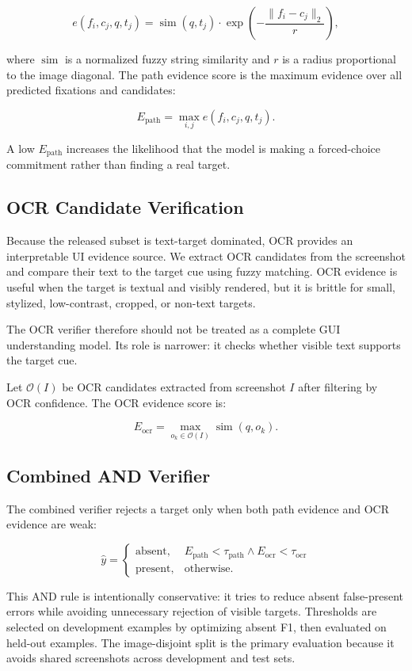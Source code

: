 \[
  e(f_i, c_j, q, t_j) =
  \operatorname{sim}(q,t_j) \cdot \exp\left(-\frac{\|f_i-c_j\|_2}{r}\right),
\]

where $\operatorname{sim}$ is a normalized fuzzy string similarity and $r$ is a radius proportional to the image diagonal. The path evidence score is the maximum evidence over all predicted fixations and candidates:

\[
  E_{\mathrm{path}} = \max_{i,j} e(f_i,c_j,q,t_j).
\]

A low $E_{\mathrm{path}}$ increases the likelihood that the model is making a forced-choice commitment rather than finding a real target.

\subsection{OCR Candidate Verification}

Because the released subset is text-target dominated, OCR provides an interpretable UI evidence source. We extract OCR candidates from the screenshot and compare their text to the target cue using fuzzy matching. OCR evidence is useful when the target is textual and visibly rendered, but it is brittle for small, stylized, low-contrast, cropped, or non-text targets.

The OCR verifier therefore should not be treated as a complete GUI understanding model. Its role is narrower: it checks whether visible text supports the target cue.

Let $\mathcal{O}(I)$ be OCR candidates extracted from screenshot $I$ after filtering by OCR confidence. The OCR evidence score is:

\[
  E_{\mathrm{ocr}} = \max_{o_k \in \mathcal{O}(I)} \operatorname{sim}(q,o_k).
\]

\subsection{Combined AND Verifier}

The combined verifier rejects a target only when both path evidence and OCR evidence are weak:

\[
  \hat{y} =
  \begin{cases}
  \mathrm{absent}, & E_{\mathrm{path}} < \tau_{\mathrm{path}} \land E_{\mathrm{ocr}} < \tau_{\mathrm{ocr}}\\
  \mathrm{present}, & \mathrm{otherwise.}
  \end{cases}
\]

This AND rule is intentionally conservative: it tries to reduce absent false-present errors while avoiding unnecessary rejection of visible targets. Thresholds are selected on development examples by optimizing absent F1, then evaluated on held-out examples. The image-disjoint split is the primary evaluation because it avoids shared screenshots across development and test sets.

